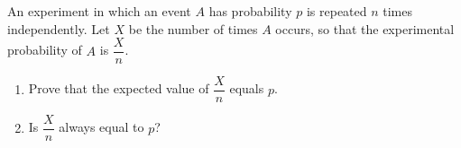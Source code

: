 An experiment in which an event $A$ has probability $p$ is repeated $n$ times independently. Let $X$ be the number of times $A$ occurs, so that the experimental probability of $A$ is $\dfrac Xn$.
\begin{enumerate}
\item[(a)] Prove that the expected value of $\dfrac Xn$ equals $p$.
\item[(b)] Is $\dfrac Xn$ always equal to $p$?
\end{enumerate}
